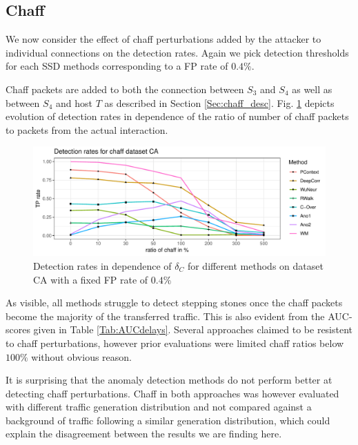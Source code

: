 \documentclass[runningheads,11pt]{llncs}\usepackage[]{graphicx}\usepackage[]{color}
\makeatletter
\def\maxwidth{ %
  \ifdim\Gin@nat@width>\linewidth
    \linewidth
  \else
    \Gin@nat@width
  \fi
}
\newenvironment{knitrout}{}{} %
\makeatother
\begin{document}
\subsection{Chaff}

We now consider the effect of chaff perturbations added by the attacker to individual connections on the detection rates. Again we pick detection thresholds for each SSD methods corresponding to a FP rate of $0.4\%$.%

Chaff packets are added to both the connection between $S_3$ and $S_4$ as well as between $S_4$ and host $T$ as described in Section \ref{Sec:chaff_desc}. Fig. \ref{fig:Chaffdetection} depicts evolution of detection rates in dependence of the ratio of number of chaff packets to packets from the actual interaction.


\begin{knitrout}
\color{fgcolor}\begin{figure}
\includegraphics[width=\maxwidth]{figure/Chaffdetection-1} \caption[Detection rates in dependence of $\delta_C$ for different methods on dataset CA with a fixed FP rate of $0.4\%$]{Detection rates in dependence of $\delta_C$ for different methods on dataset CA with a fixed FP rate of $0.4\%$}\label{fig:Chaffdetection}
\end{figure}


\end{knitrout}

As visible, all methods struggle to detect stepping stones once the chaff packets become the majority of the transferred traffic. This is also evident from the AUC-scores given in Table \ref{Tab:AUCdelays}. Several approaches claimed to be resistent to chaff perturbations, however prior evaluations were limited chaff ratios below $100\%$ without obvious reason.

It is surprising that the anomaly detection methods do not perform better at detecting chaff perturbations. Chaff in both approaches was however evaluated with different traffic generation distribution and not compared against a background of traffic following a similar generation distribution, which could explain the disagreement between the results we are finding here.
\end{document}
